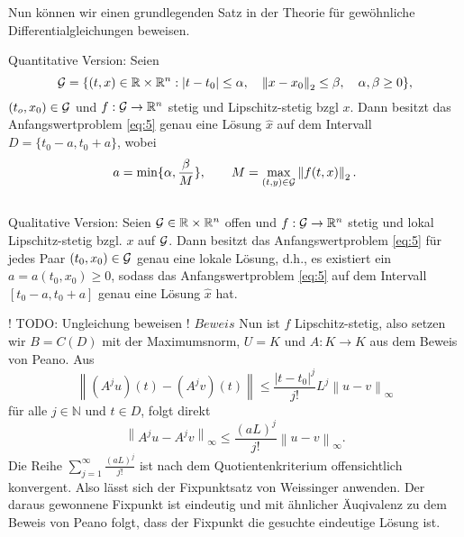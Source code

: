 Nun können wir einen grundlegenden Satz in der Theorie für gewöhnliche Differentialgleichungen beweisen.
\begin{satz}
Quantitative Version: Seien
\[
        {\cal G}=\{(t,x) \in \mathbb{R} \times \mathbb{R}^{n}: |t-t_{0}| \leq \alpha, \quad
    \left\lVert x-x_{0} \right\rVert _{2} \leq\beta, \quad \alpha,\beta \geq 0 \},
\]
$(t_{o},x_{0})\in {\cal G}$ und $f:{\cal G} \rightarrow \mathbb{R}^{n}$ stetig und Lipschitz-stetig bzgl $x$.
Dann besitzt das Anfangswertproblem \eqref{eq:5} genau eine Lösung $\hat{x}$ auf dem Intervall
$D=\{t_{0}-a,t_{0}+a\}$, wobei
\[
    a=\min\{\alpha, \frac{\beta}{M}\}, \qquad M= \max_{(t,y)\in {\cal G}}\left\lVert f(t,x)\right\rVert_{2} .
\]\\
Qualitative Version: Seien ${\cal G}\in \mathbb{R} \times \mathbb{R}^{n}$ offen und $f:{\cal G} \rightarrow \mathbb{R}^{n}$ stetig und lokal
Lipschitz-stetig bzgl. $x$ auf $\cal{G}$. Dann besitzt das Anfangswertproblem \eqref{eq:5} für jedes Paar
$(t_{0},x_{0}) \in {\cal G}$ genau eine lokale Lösung, d.h., es existiert ein $a=a(t_{0},x_{0}) \geq 0$, sodass
das Anfangswertproblem \eqref{eq:5} auf dem Intervall $[t_{0}-a,t_{0}+a]$ genau eine Lösung $\hat{x}$ hat.
\end{satz}
! TODO: Ungleichung beweisen !
$Beweis$ Nun ist $f$ Lipschitz-stetig, also setzen wir $B=C(D)$ mit der Maximumsnorm, $U=K$ und $A:K \rightarrow K$
aus dem Beweis von Peano. Aus
\[
    \left\lVert (A^j u)(t) - (A^j v)(t) \right\rVert \leq \frac{|t-t_0|^j}{j!} L^j\left\lVert u - v \right\rVert_{\infty}
\]
für alle $j \in \mathbb{N}$ und $t \in D$, folgt direkt
\[
    \left\lVert A^j u - A^j v \right\rVert_{\infty} \leq \frac{(aL)^j}{j!} \left\lVert u - v \right\rVert_{\infty}.
\]
Die Reihe $\sum_{j=1}^{\infty} \frac{(aL)^j}{j!} $ ist nach dem Quotientenkriterium offensichtlich konvergent. Also
lässt sich der Fixpunktsatz von Weissinger anwenden. Der daraus gewonnene Fixpunkt ist eindeutig und mit ähnlicher
Äuqivalenz zu dem Beweis von Peano folgt, dass der Fixpunkt die gesuchte eindeutige Lösung ist. \qedwhite

